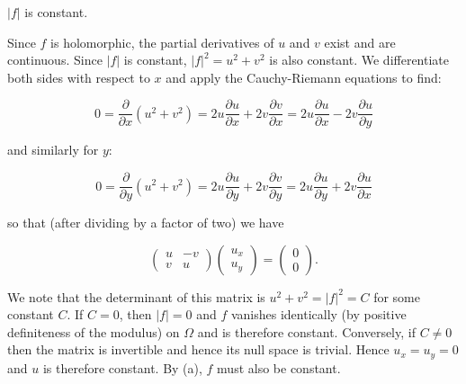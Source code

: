 $|f|$ is constant.

\begin{solution}
    Since $f$ is holomorphic, the partial derivatives of $u$ and $v$ exist and are continuous. Since $|f|$ is constant,
    $|f|^2 = u^2 + v^2$ is also constant. We differentiate both sides with respect to $x$ and apply the Cauchy-Riemann 
    equations to find:

    $$
    0 = \frac{\partial}{\partial x}(u^2 + v^2) = 2u\frac{\partial u}{\partial x} + 2v\frac{\partial v}{\partial x} = 2u\frac{\partial u}{\partial x} - 2v\frac{\partial u}{\partial y}
    $$

    and similarly for $y$:

    $$
    0 = \frac{\partial}{\partial y}(u^2 + v^2) = 2u\frac{\partial u}{\partial y} + 2v\frac{\partial v}{\partial y} = 2u\frac{\partial u}{\partial y} + 2v\frac{\partial u}{\partial x}
    $$

    so that (after dividing by a factor of two) we have

    $$
    \begin{pmatrix*}
        u & -v \\
        v & u
    \end{pmatrix*} \begin{pmatrix*}
        u_x \\
        u_y
    \end{pmatrix*} = \begin{pmatrix*}
        0 \\
        0
    \end{pmatrix*}.
    $$

    We note that the determinant of this matrix is $u^2 + v^2 = |f|^2 = C$ for some constant $C$. If $C = 0$, then 
    $|f| = 0$ and $f$ vanishes identically (by positive definiteness of the modulus) on $\Omega$ and is therefore 
    constant. Conversely, if $C \neq 0$ then the matrix is invertible and hence its null space is trivial. Hence 
    $u_x = u_y = 0$ and $u$ is therefore constant. By (a), $f$ must also be constant.
    \ \\
\end{solution}